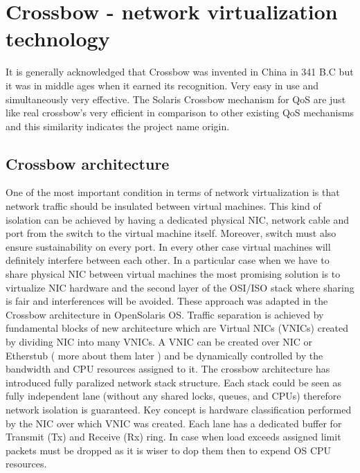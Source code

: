 \documentclass[11pt]{book}
\begin{document}
    \section{Crossbow - network virtualization technology}


        It is generally acknowledged that Crossbow was invented in China in 341 B.C but it was in middle ages when 
        it earned its recognition. Very easy in use and simultaneously very effective. The Solaris Crossbow mechanism 
        for QoS are just like real crossbow's very efficient in comparison to other existing QoS mechanisms and this
        similarity indicates the project name origin.

    \subsection{Crossbow architecture}

        One of the most important condition in terms of network virtualization is that network traffic
      should be insulated between virtual machines. This kind of isolation can be achieved by having
      a dedicated physical NIC, network cable and port from the switch to the virtual machine
      itself. Moreover, switch must also ensure sustainability on every port. In every other case
      virtual machines will definitely interfere between each other.
        In a particular case when we have to share physical NIC between virtual machines the most promising solution is to
      virtualize NIC hardware and the second layer of the OSI/ISO stack where sharing is fair and
      interferences will be avoided. These approach was adapted in the Crossbow architecture in
      OpenSolaris OS.
        Traffic separation is achieved by fundamental blocks of new architecture
      which are Virtual NICs (VNICs) created by dividing NIC into many VNICs. 
        A VNIC can be created over NIC or Etherstub ( more about them later ) and be dynamically controlled by the
      bandwidth and CPU resources assigned to it.
        The crossbow architecture has introduced fully paralized network stack structure. Each stack could be seen as fully independent lane (without
      any shared locks, queues, and CPUs) therefore network isolation is guaranteed. Key concept is
      hardware classification performed by the NIC over which VNIC was created. Each lane has a
      dedicated buffer for Transmit (Tx) and Receive (Rx) ring. In case when load exceeds assigned
      limit packets must be dropped as it is wiser to dop them then to expend OS CPU resources. 
\end{document}
